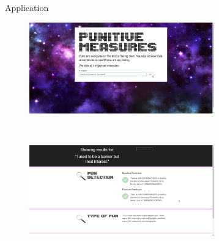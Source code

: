 \documentclass[final]{beamer}
\newlength{\sepwid}
\newlength{\onecolwid}
\begin{document}
\begin{frame}[t]
\begin{columns}[t]
\begin{column}{\onecolwid}
\begin{block}{Application}
				\begin{figure}
					\centering
					\includegraphics[width=0.75\textwidth]{UI_1.jpg}\\
				\end{figure}
				\\
				\vspace{20mm}
				\begin{figure}
					\centering
					\includegraphics[width=0.75\textwidth]{UI_2.png}\\
				\end{figure}
			\end{block}
			\vspace{20mm}
		\end{column}
		\begin{column}{\sepwid}\end{column}
	\end{columns}
\end{frame}
\end{document}
